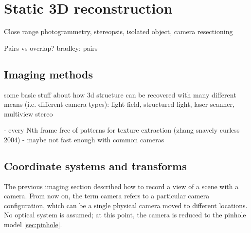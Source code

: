 \section{Static 3D reconstruction}





Close range photogrammetry, stereopsis, isolated object, camera resectioning

Pairs vs overlap? bradley: pairs


\subsection{Imaging methods} %


some basic stuff about how 3d structure can be recovered with many different means (i.e. different camera types): light field, structured light, laser scanner, multiview stereo

- every Nth frame free of patterns for texture extraction (zhang snavely curless 2004)
- maybe not fast enough with common cameras


\subsection{Coordinate systems and transforms} %




The previous imaging section described how to record a view of a scene with a camera. From now on, the term camera refers to a particular camera configuration, which can be a single physical camera moved to different locations.
No optical system is assumed; at this point, the camera is reduced to the pinhole model \ref{sec:pinhole}.

